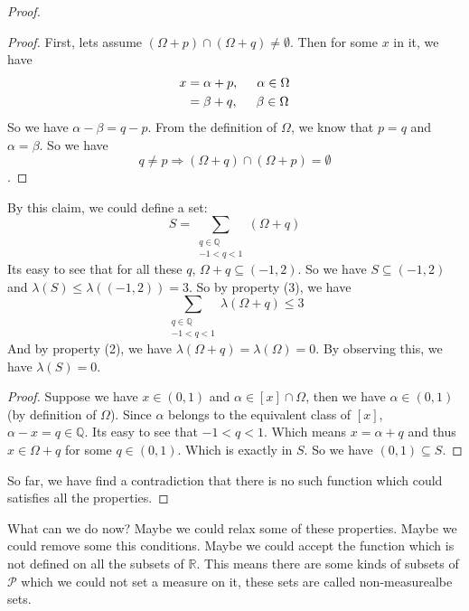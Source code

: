 \begin{proof}
\begin{claim}[For a set $\Omega\subseteq\mathbb{R}$, and $p, q\in\mathbb{R}$. Either we have $\Omega+p = \Omega+q$, eigher we have $\Omega+p$ disjoints with $\Omega+q$]
  \begin{proof}
    First, lets assume $(\Omega + p)\cap(\Omega+q)\not=\emptyset$.
    Then for some $x$ in it, we have
    \begin{align*}
      x &= \alpha + p, \hspace{0.5cm} \alpha\in\Omega \\
        &= \beta + q,  \hspace{0.5cm} \beta \in\Omega
    \end{align*}
    So we have $\alpha - \beta = q - p$.
    From the definition of $\Omega$, we know that $p = q$ and $\alpha = \beta$.
    So we have \[q\not= p \Rightarrow (\Omega + q)\cap(\Omega+p) = \emptyset\].
  \end{proof}
\end{claim}
  By this claim, we could define a set:
  \[ S = \sum_{\substack{q\in\mathbb{Q}\\-1 < q < 1}}(\Omega + q) \]
  Its easy to see that for all these $q$, $\Omega + q \subseteq (-1, 2)$.
  So we have $S\subseteq(-1, 2)$ and $\lambda(S) \leq \lambda((-1, 2)) = 3$.
  So by property (3), we have
  \[\sum_{\substack{q\in\mathbb{Q}\\-1<q<1}} \lambda(\Omega + q) \leq 3\]
  And by property (2), we have $\lambda(\Omega + q) = \lambda(\Omega) = 0$.
  By observing this, we have $\lambda(S) = 0$.
  \begin{claim}[$(0, 1) \subseteq S$]
    \begin{proof}
      Suppose we have $x\in(0,1)$ and $\alpha\in [x]\cap\Omega$, then we have $\alpha\in(0, 1)$ (by definition of $\Omega$). Since $\alpha$ belongs to the equivalent class of $[x]$, $\alpha - x = q\in\mathbb{Q}$. Its easy to see that $-1 < q < 1$. Which means $x=\alpha + q$ and thus $x\in\Omega + q$ for some $q\in(0,1)$. Which is exactly in $S$. So we have $(0, 1)\subseteq S$.
    \end{proof}
  \end{claim}
  So far, we have find a contradiction that there is no such function which could satisfies all the properties.
\end{proof}

What can we do now? Maybe we could relax some of these properties.
Maybe we could remove some this conditions.
Maybe we could accept the function which is not defined on all the subsets of $\mathbb{R}$. This means there are some kinds of subsets of $\mathcal{P}$ which we could not set a measure on it, these sets are called non-measurealbe sets.

